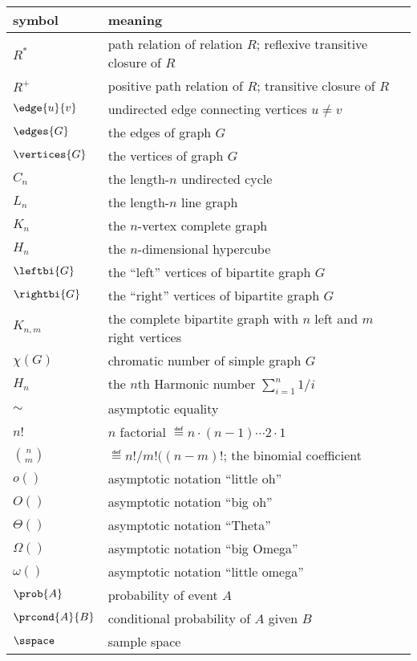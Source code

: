 \begin{center}
\begin{tabular}{ll}
symbol         &  meaning\\
\hline
$R^*$          & path relation of relation $R$; reflexive transitive closure of $R$\\
$R^+$          & positive path relation of $R$; transitive closure of $R$\\
$\edge{u}{v}$  & undirected edge connecting vertices $u \neq v$\\
$\edges{G}$    & the edges of graph $G$\\
$\vertices{G}$ & the vertices of graph $G$\\
$C_n$          & the length-$n$ undirected cycle\\
$L_n$          & the length-$n$ line graph\\
$K_n$          & the $n$-vertex complete graph\\
$H_n$          & the $n$-dimensional hypercube\\
$\leftbi{G}$   & the ``left'' vertices of bipartite graph $G$\\
$\rightbi{G}$  & the ``right'' vertices of bipartite graph $G$\\
$K_{n,m}$       & the complete bipartite graph with $n$ left and $m$ right vertices\\
$\chi(G)$      & chromatic number of simple graph $G$\\
$H_n$          & the $n$th Harmonic number $\sum_{i=1}^n 1/i$\\
$\sim$         & asymptotic equality\\
$n!$           & $n$ factorial $\eqdef n \cdot (n-1) \cdots 2 \cdot 1$\\
$\binom{n}{m}$ & $\eqdef n!/m!((n-m)!$; the binomial coefficient\\
$o()$          & asymptotic notation ``little oh''\\
$O()$          & asymptotic notation ``big oh''\\
$\Theta()$     & asymptotic notation ``Theta''\\
$\Omega()$     & asymptotic notation ``big Omega''\\
$\omega()$     & asymptotic notation ``little omega''\\
$\prob{A}$     & probability of event $A$\\
$\prcond{A}{B}$ & conditional probability of $A$ given $B$\\
$\sspace$      & sample space\\

\end{tabular}
\end{center}
